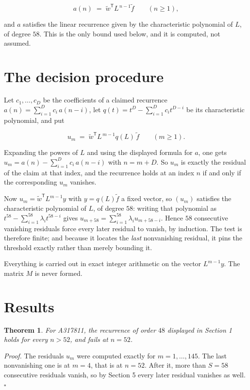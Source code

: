 \documentclass[11pt]{article}
\newtheorem{theorem}{Theorem}
\theoremstyle{definition}
\begin{document}
\[a(n) \;=\; \tilde w^{\mathsf T} L^{\,n-1} \tilde f \qquad (n \ge 1),\]

and $a$ satisfies the linear recurrence given by the characteristic polynomial of $L$, of degree $58$. This is the only bound used below, and it is computed, not assumed.

\section{The decision procedure}

Let $c_1,\dots,c_D$ be the coefficients of a claimed recurrence $a(n) = \sum_{i=1}^{D} c_i\,a(n-i)$, let $q(t) = t^{D} - \sum_{i=1}^{D} c_i t^{D-i}$ be its characteristic polynomial, and put

\[u_m \;=\; \tilde w^{\mathsf T} L^{\,m-1} q(L)\,\tilde f \qquad (m \ge 1).\]

Expanding the powers of $L$ and using the displayed formula for $a$, one gets $u_m = a(n) - \sum_{i=1}^{D} c_i\,a(n-i)$ with $n = m + D$. So $u_m$ is exactly the residual of the claim at that index, and the recurrence holds at an index $n$ if and only if the corresponding $u_m$ vanishes.

Now $u_m = \tilde w^{\mathsf T} L^{m-1} y$ with $y = q(L)\tilde f$ a fixed vector, so $(u_m)$ satisfies the characteristic polynomial of $L$, of degree $58$: writing that polynomial as $t^{58} - \sum_{i=1}^{58} \lambda_i t^{58-i}$ gives $u_{m+58} = \sum_{i=1}^{58} \lambda_i u_{m+58-i}$. Hence $58$ consecutive vanishing residuals force every later residual to vanish, by induction. The test is therefore finite; and because it locates the {\itshape last} nonvanishing residual, it pins the threshold exactly rather than merely bounding it.

Everything is carried out in exact integer arithmetic on the vector $L^{m-1}y$. The matrix $M$ is never formed.

\section{Results}

\begin{theorem} For A317811, the recurrence of order $48$ displayed in Section 1 holds for every $n > 52$, and fails at $n = 52$.\end{theorem}

{\itshape Proof.} The residuals $u_m$ were computed exactly for $m = 1,\dots,145$. The last nonvanishing one is at $m = 4$, that is at $n = 52$. After it, more than $S = 58$ consecutive residuals vanish, so by Section 5 every later residual vanishes as well. $\square$
\end{document}
